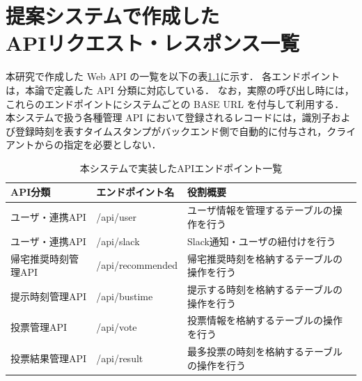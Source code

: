 \chapter[提案システムで作成したAPIリクエスト・レスポンス一覧]{提案システムで作成した\\APIリクエスト・レスポンス一覧}
本研究で作成した Web API の一覧を以下の表\ref{tab:AllAPI}に示す．
各エンドポイントは，本論で定義した API 分類に対応している．
なお，実際の呼び出し時には，これらのエンドポイントにシステムごとの BASE URL を付与して利用する．
本システムで扱う各種管理 API において登録されるレコードには，識別子および登録時刻を表すタイムスタンプがバックエンド側で自動的に付与され，クライアントからの指定を必要としない．


\begin{table}[htb]
  \centering
  \caption{本システムで実装したAPIエンドポイント一覧}
  \label{tab:AllAPI}
  \begin{tabular}{|l|l|l|}
    \hline
    \textbf{API分類} & \textbf{エンドポイント名} & \textbf{役割概要}          \\
    \hline
    ユーザ・連携API      & /api/user         & ユーザ情報を管理するテーブルの操作を行う   \\
    ユーザ・連携API      & /api/slack        & Slack通知・ユーザの紐付けを行う     \\
    帰宅推奨時刻管理API    & /api/recommended  & 帰宅推奨時刻を格納するテーブルの操作を行う  \\
    提示時刻管理API      & /api/bustime      & 提示する時刻を格納するテーブルの操作を行う  \\
    投票管理API        & /api/vote         & 投票情報を格納するテーブルの操作を行う    \\
    投票結果管理API      & /api/result       & 最多投票の時刻を格納するテーブルの操作を行う \\
    \hline
  \end{tabular}
\end{table}


